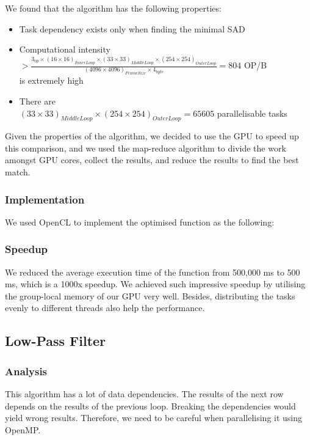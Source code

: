 \documentclass[a4paper]{article}
\begin{document}
We found that the algorithm has the following properties:
\begin{itemize}
\item Task dependency exists only when finding the minimal SAD
\item Computational intensity \\
  \(> \frac{3_{op} \times (16 \times 16)_{InnerLoop} \times (33 \times 33)_{MiddleLoop} \times
    (254 \times 254)_{OuterLoop}}{(4096 \times 4096)_{FrameSize} \times 4_{byte}} =
  804\) OP/B \\
  is extremely high
\item There are \\
  \((33 \times 33)_{MiddleLoop} \times (254 \times 254)_{OuterLoop} = 65605\)
  parallelisable tasks
\end{itemize}

Given the properties of the algorithm, we decided to use the GPU to
speed up this comparison, and we used the map-reduce algorithm to
divide the work amongst GPU cores, collect the results, and reduce the
results to find the best match.

\subsubsection{Implementation}
We used OpenCL to implement the optimised function as the following:


\subsubsection{Speedup}
We reduced the average execution time of the function from 500,000 ms
to 500 ms, which is a 1000x speedup. We achieved such impressive
speedup by utilising the group-local memory of our GPU very well.
Besides, distributing the tasks evenly to different threads also help
the performance.

\subsection{Low-Pass Filter}
\subsubsection{Analysis}
This algorithm has a lot of data dependencies. The results of the next
row depends on the results of the previous loop. Breaking the
dependencies would yield wrong results. Therefore, we need to be
careful when parallelising it using OpenMP.
\end{document}
